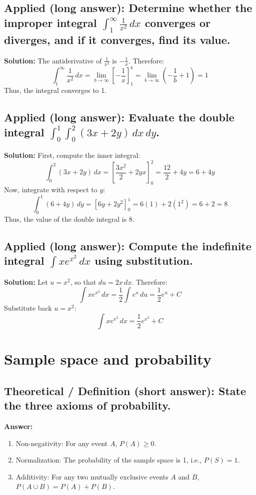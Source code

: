 \documentclass[12pt]{article}
\begin{document}
\subsection{Applied (long answer): Determine whether the improper integral \( \int_1^\infty \frac{1}{x^2} \, dx \) converges or diverges, and if it converges, find its value.}
\textbf{Solution:}
The antiderivative of \( \frac{1}{x^2} \) is \( -\frac{1}{x} \). Therefore:
\[
\int_1^\infty \frac{1}{x^2} \, dx = \lim_{b \to \infty} \left[ -\frac{1}{x} \right]_1^b = \lim_{b \to \infty} \left( -\frac{1}{b} + 1 \right) = 1
\]
Thus, the integral converges to 1.

\subsection{Applied (long answer): Evaluate the double integral \( \int_0^1 \int_0^2 (3x + 2y) \, dx \, dy \).}
\textbf{Solution:}
First, compute the inner integral:
\[
\int_0^2 (3x + 2y) \, dx = \left[ \frac{3x^2}{2} + 2yx \right]_0^2 = \frac{12}{2} + 4y = 6 + 4y
\]
Now, integrate with respect to \( y \):
\[
\int_0^1 (6 + 4y) \, dy = \left[ 6y + 2y^2 \right]_0^1 = 6(1) + 2(1^2) = 6 + 2 = 8
\]
Thus, the value of the double integral is 8.

\subsection{Applied (long answer): Compute the indefinite integral \( \int x e^{x^2} \, dx \) using substitution.}
\textbf{Solution:}
Let \( u = x^2 \), so that \( du = 2x \, dx \). Therefore:
\[
\int x e^{x^2} \, dx = \frac{1}{2} \int e^u \, du = \frac{1}{2} e^u + C
\]
Substitute back \( u = x^2 \):
\[
\int x e^{x^2} \, dx = \frac{1}{2} e^{x^2} + C
\]

\section{Sample space and probability}



\subsection{Theoretical / Definition (short answer): State the three axioms of probability.}

\textbf{Answer:}
\begin{enumerate}
    \item  Non-negativity: For any event \( A \), \( P(A) \geq 0 \).
    \item  Normalization: The probability of the sample space is 1, i.e., \( P(S) = 1 \).
    \item  Additivity: For any two mutually exclusive events \( A \) and \( B \), \( P(A \cup B) = P(A) + P(B) \).

\end{enumerate}
\end{document}

